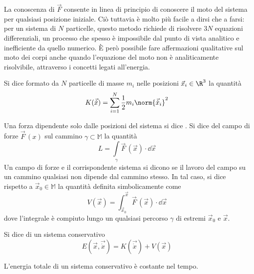 La conoscenza di $\vec{F}$ consente in linea di principio di conoscere il moto del sistema per qualsiasi posizione iniziale. Ciò tuttavia è molto più facile a dirsi che a farsi: per un sistema di $N$ particelle, questo metodo richiede di risolvere $3N$ equazioni differenziali, un processo che spesso è impossibile dal punto di vista analitico e inefficiente da quello numerico. È però possibile fare affermazioni qualitative sul moto dei corpi anche quando l'equazione del moto non è analiticamente risolvibile, attraverso i concetti legati all'energia.
\begin{definition}
  Si dice  formato da $N$ particelle di masse $m_i$ nelle posizioni $\vec{x}_i \in \R^3$ la quantità \begin{equation}
    K(\vec{\dot{x}}) = \sum_{i=1}^{N} \frac{1}{2}m_i\norm{\vec{\dot{x}}_i}^2
  \end{equation} 
\end{definition}
\begin{definition}
  Una forza dipendente solo dalle posizioni del sistema si dice . Si dice  del campo di forze $\vec{F}\, (x)$ sul cammino $\gamma \subset \mathbb{M}$ la quantità \begin{equation*}
  L = \int\limits_{\gamma} \vec{F}\,(\vec{x})\cdot \dd \vec{x}
  \end{equation*} 
  Un campo di forze e il corrispondente sistema si dicono  se il lavoro del campo su un cammino qualsiasi non dipende dal cammino stesso. In tal caso, si dice  rispetto a $\vec{x}_0 \in \mathbb{M}$ la quantità definita simbolicamente come \begin{equation}
  V(\vec{x}) = \int_{\vec{x}_0}^{\vec{x}} \vec{F}\,(\vec{x})\cdot \dd \vec{x}
  \end{equation} 
  dove l'integrale è compiuto lungo un qualsiasi percorso $\gamma$ di estremi $\vec{x}_0$ e $\vec{x}$.
\end{definition}
\begin{definition}
  Si dice  di un sistema conservativo\begin{equation}
  E(\vec{x},\vec{\dot{x}}) = K(\vec{\dot{x}}) + V(\vec{x})
  \end{equation} 
\end{definition}
\begin{theorem} \label{thm:energyCons}
L'energia totale di un sistema conservativo è costante nel tempo.
\end{theorem}

